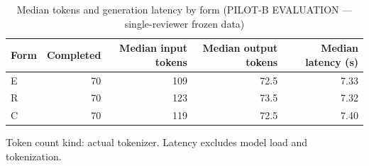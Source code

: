 \begin{table}[t]
\centering
\small
\caption{Median tokens and generation latency by form (PILOT-B EVALUATION --- single-reviewer frozen data)}
\label{tab:pilotb-Qwen3-8B-resources}
\begin{tabular}{lrrrr}
\toprule
Form & Completed & Median input tokens & Median output tokens & Median latency (s) \\
\midrule
E & 70 & 109 & 72.5 & 7.33 \\
R & 70 & 123 & 73.5 & 7.32 \\
C & 70 & 119 & 72.5 & 7.40 \\
\bottomrule
\end{tabular}
\par\smallskip
\parbox{\linewidth}{\footnotesize Token count kind: actual tokenizer. Latency excludes model load and tokenization.}
\end{table}
